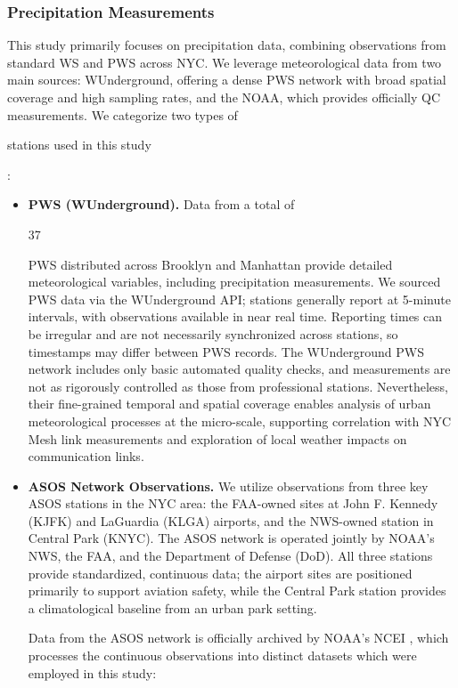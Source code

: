 \documentclass[manuscript]{copernicus}
\newif\ifshowrevisions
\newcommand{\blue}[1]{%
  \ifshowrevisions
    \textcolor{black}{#1}%
  \else
    #1%
  \fi
}
\begin{document}
\subsubsection{Precipitation Measurements}
This study primarily focuses on precipitation data, combining observations from standard WS and PWS across NYC. We leverage meteorological data from two main sources: WUnderground, offering a dense PWS network with broad spatial coverage and high sampling rates, and the NOAA, which provides officially QC measurements.
We categorize two types of \blue{stations used in this study}:
\begin{itemize}
\item \textbf{PWS (WUnderground).}
Data from a total of \blue{37} PWS distributed across Brooklyn and Manhattan provide detailed 
meteorological variables, including precipitation measurements. 
We sourced PWS data via the WUnderground API; stations generally report at 5-minute intervals, with observations available in near real time. Reporting times can be irregular and are not necessarily synchronized across stations, so timestamps may differ between PWS records. The WUnderground PWS network includes only basic automated quality checks, and measurements are not as rigorously controlled as those from professional stations.
Nevertheless, their fine-grained temporal and spatial coverage enables analysis of urban meteorological processes at the micro-scale, supporting correlation with NYC Mesh link measurements and exploration of local weather impacts on communication links.

\item  \blue{\textbf{ASOS Network Observations.}
We utilize observations from three key ASOS stations in the NYC area: the FAA-owned sites at John F. Kennedy (KJFK) and LaGuardia (KLGA) airports, and the NWS-owned station in Central Park (KNYC). The ASOS network is operated jointly by NOAA's NWS, the FAA, and the Department of Defense (DoD). All three stations provide standardized, continuous data; the airport sites are positioned primarily to support aviation safety, while the Central Park station provides a climatological baseline from an urban park setting. }
Data from the ASOS network is officially archived by NOAA's NCEI \citep{NOAA2005Asos5Min}, which processes the continuous observations into distinct datasets which were employed in this study:
\end{itemize}
\end{document}
